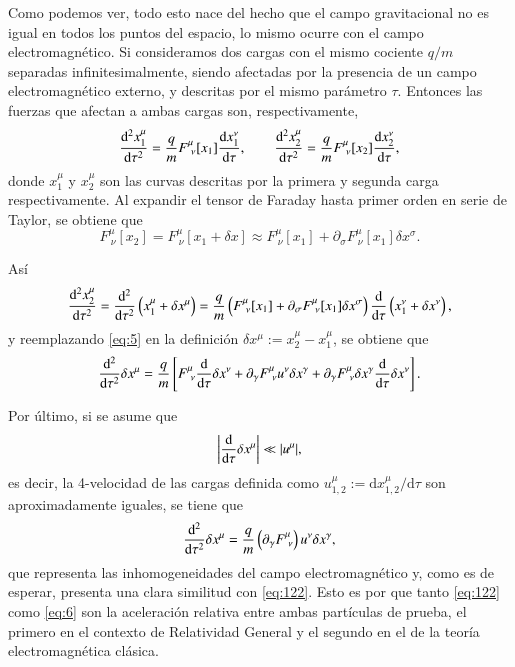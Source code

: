 Como podemos ver, todo esto nace del hecho que el campo gravitacional no es igual en todos los puntos del espacio, lo mismo ocurre con el campo electromagnético. Si consideramos dos cargas con el mismo cociente $q/m$ separadas infinitesimalmente, siendo afectadas por la presencia de un campo electromagnético externo, y descritas por el mismo parámetro $\tau$. Entonces las fuerzas que afectan a ambas cargas son, respectivamente,
\begin{equation}
\label{eq:4}
\dv[2]{x_1^{\mu}}{\tau} = \frac{q}{m} F^{\mu}_{\ \nu}[x_1] \dv{x_1^{\nu}}{\tau}, \qquad 
\dv[2]{x_2^{\mu}}{\tau} = \frac{q}{m} F^{\mu}_{\ \nu}[x_2] \dv{x_2^{\nu}}{\tau},
\end{equation}
donde $x_1^{\mu}$ y $x_2^{\mu}$ son las curvas descritas por la primera y segunda carga respectivamente. Al expandir el tensor de Faraday hasta primer orden en serie de Taylor, se obtiene que
\begin{equation}
F^{\mu}_{\ \nu}[x_2] = F^{\mu}_{\ \nu}[x_1 + \delta x] \approx F^{\mu}_{\ \nu}[x_1] + \partial_{\sigma} F^{\mu}_{\ \nu}[x_1] \delta x^{\sigma}.
\end{equation}

Así 
\begin{equation}
\label{eq:5}
\dv[2]{x_2^{\mu}}{\tau} = \dv[2]{ }{\tau} \left( x_1^{\mu} + \delta x^{\mu} \right) = \frac{q}{m} \left( F^{\mu}_{\ \nu}[x_1] + \partial_{\sigma} F^{\mu}_{\ \nu}[x_1] \delta x^{\sigma} \right) \dv{ }{\tau} \left( x_1^{\nu} + \delta x^{\nu} \right),
\end{equation}
y reemplazando \eqref{eq:5} en la definición $\delta x^{\mu} := x_2^{\mu} - x_1^{\mu}$, se obtiene que
\begin{equation}
\dv[2]{ }{\tau} \delta x^{\mu} = \frac{q}{m} \left[ F^{\mu}_{\ \nu} \dv{ }{\tau} \delta x^{\nu} + \partial_{\gamma} F^{\mu}_{\ \nu} u^{\nu} \delta x^{\gamma} + \partial_{\gamma} F^{\mu}_{\ \nu} \delta x^{\gamma} \dv{ }{\tau} \delta x^{\nu} \right].
\end{equation}

Por último, si se asume que
\begin{equation}
\left| \dv{\tau} \delta x^{\mu} \right| \ll |u^{\mu}|,
\end{equation}
es decir, la 4-velocidad de las cargas definida como $u^{\mu}_{1,2} := \mathrm{d}x^{\mu}_{1,2}/\mathrm{d}\tau $ son aproximadamente iguales, se tiene que
\begin{equation}
\label{eq:6}
\dv[2]{ }{\tau} \delta x^{\mu} = \frac{q}{m} \left( \partial_{\gamma} F^{\mu}_{\ \nu} \right) u^{\nu} \delta x^{\gamma},
\end{equation}
que representa las inhomogeneidades del campo electromagnético y, como es de esperar, presenta una clara similitud con \eqref{eq:122}. Esto es por que tanto \eqref{eq:122} como \eqref{eq:6} son la aceleración relativa entre ambas partículas de prueba, el primero en el contexto de Relatividad General y el segundo en el de la teoría electromagnética clásica.

